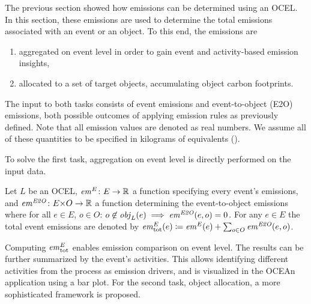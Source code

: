 The previous section showed how emissions can be determined using an OCEL.
In this section, these emissions are used to determine the total emissions associated with an event or an object.
To this end, the emissions are
\begin{enumerate}
  \item aggregated on event level in order to gain event and activity-based emission insights,
  \item allocated to a set of target objects, accumulating object carbon footprints.
\end{enumerate}

The input to both tasks consists of event emissions and event-to-object (E2O) emissions, both possible outcomes of applying emission rules as previously defined.
Note that all emission values are denoted as real numbers. We assume all of these quantities to be specified in kilograms of \COtwo{} equivalents (\unit{\kgcotwoe}).

To solve the first task, aggregation on event level is directly performed on the input data.

\begin{definition}
  Let $L$ be an OCEL, 
  $\mathit{em}^E\colon E\to\mathbb{R}$ a function specifying every event's emissions,
  and $\mathit{em}^{\mathit{E2O}}\colon E {\times} O \to \mathbb{R}$ a function determining the event-to-object emissions where for all $e \in E$, $o \in O$: $o \not\in \mathit{obj}_L(e) \implies \mathit{em}^{\mathit{E2O}}(e, o) = 0$.
  For any $e \in E$ the total event emissions are denoted by
  $\mathit{em}^E_{\text{tot}}(e) \coloneqq \mathit{em}^E(e) + \sum_{o \in O} \mathit{em}^{\mathit{E2O}}(e, o)$.
  \label{def:alloc-input}
\end{definition}

Computing $\mathit{em}^E_{\text{tot}}$ enables emission comparison on event level. The results can be further summarized by the event's activities. This allows identifying different activities from the process as emission drivers,
and is visualized in the OCEAn application using a bar plot.
%
For the second task, object allocation, a more sophisticated framework is proposed.

